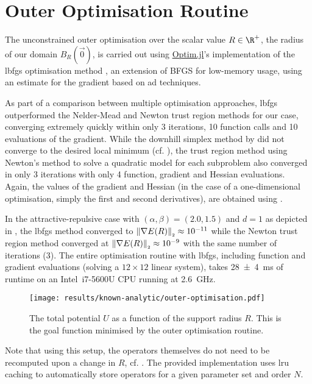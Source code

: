 \section{Outer Optimisation Routine}
The unconstrained outer optimisation over the scalar value $R \in \R^+$, the radius of our domain $B_R(\vec{0})$, is carried out using \href{https://github.com/JuliaNLSolvers/Optim.jl}{Optim.jl}'s implementation \parencite{2023-optim-jl} of the \gls{lbfgs} optimisation method \parencite{1989-lbfgs}, an extension of BFGS for low-memory usage, using an estimate for the gradient based on \gls{ad} techniques.

As part of a comparison between multiple optimisation approaches, \gls{lbfgs} outperformed the Nelder-Mead and Newton trust region methods for our case, converging extremely quickly within only 3 iterations, 10 function calls and 10 evaluations of the gradient.
While the downhill simplex method by \citeauthor{1965-nelder-mead} did not converge to the desired local minimum (cf. ), the trust region method using Newton's method to solve a quadratic model for each subproblem \parencite{1982-trust-region} also converged in only 3 iterations with only 4 function, gradient and Hessian evaluations.
Again, the values of the gradient and Hessian (in the case of a one-dimensional optimisation, simply the first and second derivatives), are obtained using .

In the attractive-repulsive case with $(\alpha,\beta) = (2.0,1.5)$ and $d = 1$ as depicted in , the \gls{lbfgs} method converged to $\left\lVert\nabla E(R)\right\rVert_{\scriptscriptstyle 2} \approx 10^{-11}$ while the Newton trust region method converged at $\left\lVert\nabla E(R)\right\rVert_{\scriptscriptstyle 2} \approx 10^{-9}$ with the same number of iterations (3).
The entire optimisation routine with \gls{lbfgs}, including function and gradient evaluations (solving a $12 \times 12$ linear system), takes \SI{28 \pm 4}{\milli\second} of runtime on an Intel\textregistered \, i7-5600U CPU running at \SI{2.6}{\giga\hertz}.

\begin{figure}[H]
  \centering
  \texttt{[image: results/known-analytic/outer-optimisation.pdf]}
  \caption[Outer Optimisation Routine]{The total potential $U$ as a function of the support radius $R$. This is the goal function minimised by the outer optimisation routine.}
  \label{fig:outer-optimisation}
\end{figure}

Note that using this setup, the operators themselves do not need to be recomputed upon a change in $R$, cf. .
The provided implementation uses \gls{lru} caching to automatically store operators for a given parameter set and order $N$.

